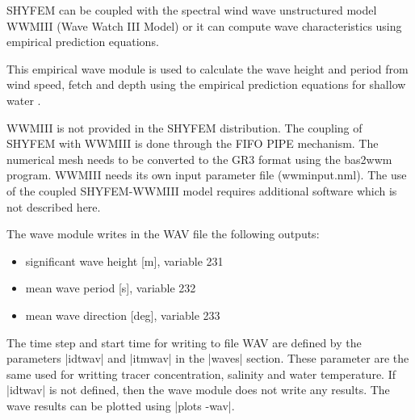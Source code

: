  SHYFEM can be coupled with the spectral wind wave unstructured
 model WWMIII (Wave Watch III Model) or it can compute wave characteristics using empirical
 prediction equations.

 This empirical wave module is used to calculate the wave height 
 and period from wind speed, fetch and depth using the empirical prediction
equations for shallow water \cite{shoreprot:84}.

 WWMIII is not provided in the SHYFEM distribution.
 The coupling of SHYFEM with WWMIII is done through the FIFO PIPE 
 mechanism. The numerical mesh needs to be converted to the GR3 
 format using the bas2wwm program. WWMIII needs its own input 
 parameter file (wwminput.nml). The use of the coupled SHYFEM-WWMIII
 model requires additional software which is not described here.

 The wave module writes in the WAV file the following outputs:
 \begin{itemize}
 \item significant wave height [m], variable 231
 \item mean wave period [s], variable 232
 \item mean wave direction [deg], variable 233
 \end{itemize}

 The time step and start time for writing to file WAV 
 are defined by the parameters |idtwav| and |itmwav| in the |waves|
 section. These parameter are the same used for writting tracer
 concentration, salinity and water temperature. If |idtwav| is not
 defined, then the wave module does not write any results. The wave 
 results can be plotted using |plots -wav|.

